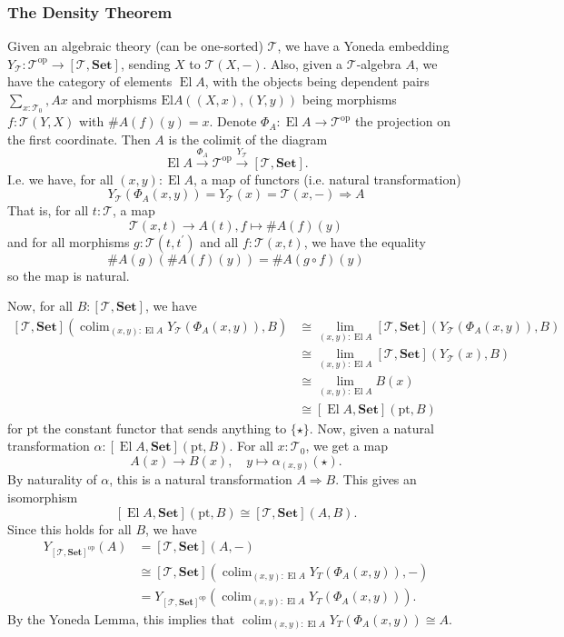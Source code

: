 \documentclass{amsbook}
\newcommand{\Catb}[1]{\mathbf{#1}}
\newcommand{\SET}{\Catb{Set}}
\newcommand{\Ob}[1]{{#1}_0}
\newcommand{\Hom}[3]{{#1}\left(#2,#3\right)}
\newcommand{\op}[1]{\ensuremath{{#1}^\text{op}}}
\theoremstyle{definition}
\begin{document}
  \subsubsection{The Density Theorem}
  Given an algebraic theory (can be one-sorted) $ \mathcal T $, we have a Yoneda embedding $ Y_{\mathcal T}: \op{\mathcal T} \to [\mathcal T, \SET] $, sending $ X $ to $ \Hom{\mathcal T}{X}{-} $. Also, given a $ \mathcal T $-algebra $ A $, we have the category of elements $ \mathop{El} A $, with the objects being dependent pairs $ \sum_{x : \Ob{\mathcal T}}, A x $ and morphisms $ \Hom{\mathrm{El}A}{(X, x)}{(Y, y)} $ being morphisms $ f : \Hom{\mathcal T}{Y}{X} $ with $ \#A(f)(y) = x $. Denote $ \Phi_A : \mathop{El} A \to \op{\mathcal T} $ the projection on the first coordinate. Then $ A $ is the colimit of the diagram
  \[ \mathop{El} A \xrightarrow{\Phi_A} \op{\mathcal T} \xrightarrow{Y_{\mathcal T}} [\mathcal T, \SET]. \]
  I.e. we have, for all $ (x, y) : \mathop{El} A $, a map of functors (i.e. natural transformation)
  \[ Y_{\mathcal T}(\Phi_A(x, y)) = Y_{\mathcal T}(x) = \Hom{\mathcal T}{x}{-} \Rightarrow A \]
  That is, for all $ t : \mathcal T $, a map
  \[ \mathcal T(x, t) \to A(t), f \mapsto \#A(f)(y) \]
  and for all morphisms $ g : \Hom{\mathcal T}{t}{t^\prime} $ and all $ f: \mathcal T(x, t) $, we have the equality
  \[ \#A(g)(\#A(f)(y)) = \#A(g \circ f)(y) \]
  so the map is natural.

  Now, for all $ B : [\mathcal T, \SET] $, we have
  \begin{align*}
    \Hom{[\mathcal T, \SET]}{\mathop{colim}_{(x, y) : \mathop{El} A} Y_{\mathcal T}(\Phi_A(x, y))}{B} &\cong \lim_{(x, y) : \mathop{El} A} \Hom{[\mathcal T, \SET]}{Y_{\mathcal T}(\Phi_A(x, y))}{B}\\
    &\cong \lim_{(x, y) : \mathop{El} A} \Hom{[\mathcal T, \SET]}{Y_{\mathcal T}(x)}{B}\\
    &\cong \lim_{(x, y) : \mathop{El} A} B(x)\\
    &\cong \Hom{[\mathop{El} A, \SET]}{\mathrm{pt}}{B}
  \end{align*}
  for $ \mathrm{pt} $ the constant functor that sends anything to $ \{ \star \} $. Now, given a natural transformation $ \alpha : \Hom{[\mathop{El} A, \SET]}{\mathrm{pt}}{B} $. For all $ x : \Ob{\mathcal T} $, we get a map
  \[ A(x) \to B(x), \quad y \mapsto \alpha_{(x, y)}(\star). \]
  By naturality of $ \alpha $, this is a natural transformation $ A \Rightarrow B $. This gives an isomorphism
  \[ \Hom{[\mathop{El} A, \SET]}{\mathrm{pt}}{B} \cong \Hom{[\mathcal T, \SET]}{A}{B}. \]
  Since this holds for all $ B $, we have
  \begin{align*}
    Y_{\op{[\mathcal T, \SET]}}(A)
    &= \Hom{[\mathcal T, \SET]}{A}{-}\\
    &\cong \Hom{[\mathcal T, \SET]}{\mathop{colim}_{(x, y) : \mathop{El} A} Y_T(\Phi_A(x, y))}{-}\\
    &= Y_{\op{[\mathcal T, \SET]}}(\mathop{colim}_{(x, y) : \mathop{El} A} Y_T(\Phi_A(x, y))).
  \end{align*}
  By the Yoneda Lemma, this implies that $ \mathop{colim}_{(x, y) : \mathop{El} A} Y_T(\Phi_A(x, y)) \cong A $.
\end{document}
